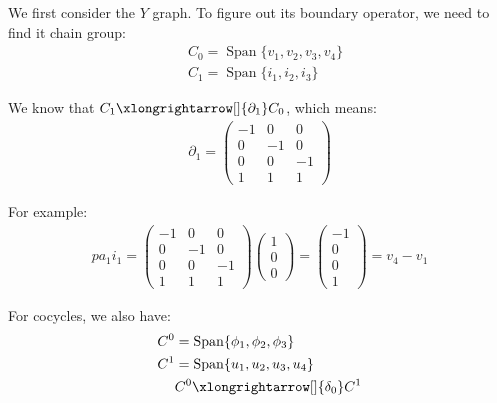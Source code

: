 \documentclass[]{ctexart}
\newcommand{\pa}{\partial}
\begin{document}
\begin{center}
\begin{tikzpicture}[x=0.75pt,y=0.75pt,yscale=-1,xscale=1]
				
				\end{tikzpicture}
				
			\end{center}
		
		We first consider the $Y$ graph. To figure out its boundary operator, we need to find it chain group:
			\begin{equation*}
			\begin{aligned}
				&C_0=\operatorname{Span}\{v_1,v_2,v_3,v_4\}\\
				&C_1=\operatorname{Span}\{i_1,i_2,i_3\}
			\end{aligned}
			\end{equation*}
		
		We know that $C_1\xlongrightarrow[]{\pa_1}C_0$, which means:
			\begin{equation*}
			\begin{aligned}
			\pa_1=
				\begin{pmatrix}
					-1 & 0 & 0\\
					0 & -1 & 0\\
					0 & 0 & -1\\
					1 & 1 & 1
				\end{pmatrix}
			\end{aligned}
			\end{equation*}
			
		For example:
			\begin{equation*}
			\begin{aligned}
				pa_1i_1=
				\begin{pmatrix}
					-1 & 0 & 0\\
					0 & -1 & 0\\
					0 & 0 & -1\\
					1 & 1 & 1
				\end{pmatrix}
				\begin{pmatrix}
					1\\
					0\\
					0
				\end{pmatrix}
				=
				\begin{pmatrix}
					-1\\
					0\\
					0\\
					1
				\end{pmatrix}=v_4-v_1
			\end{aligned}
			\end{equation*}
			
		For cocycles, we also have:
			\begin{equation*}
			\begin{aligned}
				C^0&=\operatorname{Span}\{\phi_1,\phi_2,\phi_3\}\\
				C^1&=\operatorname{Span}\{u_1,u_2,u_3,u_4\}\\
				&C^0\xlongrightarrow[]{\delta_0}C^1
			\end{aligned}
			\end{equation*}
			
\end{document}

